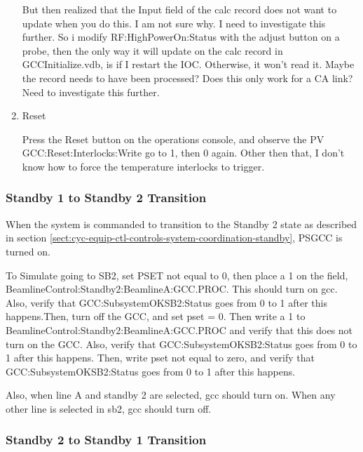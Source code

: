 \documentclass[11pt]{book}		%
\begin{document}
\begin{enumerate}
But then realized that the Input field of the calc record does not want to update when you do this. I am not sure why. I need to investigate this further. So i modify RF:HighPowerOn:Status with the adjust button on a probe, then the only way it will update on the calc record in GCCInitialize.vdb, is if I restart the IOC. Otherwise, it won't read it. Maybe the record needs to have been processed? Does this only work for a CA link? Need to investigate this further.
\color{black}


 \item Reset

\color{red}

Press the Reset button on the operations console, and observe the PV GCC:Reset:Interlocks:Write go to 1, then 0 again. Other then that, I don't know how to force the temperature interlocks to trigger.

\color{black}

\end{enumerate}

\subsubsection{Standby 1 to Standby 2 Transition}

When the system is commanded to transition to the Standby 2 state as described in section \ref{sect:cyc-equip-ctl-controls-system-coordination-standby}, PSGCC is turned on.

\color{red}

To Simulate going to SB2, set PSET not equal to 0, then place a 1 on the field, BeamlineControl:Standby2:BeamlineA:GCC.PROC. This should turn on gcc. Also, verify that GCC:SubsystemOKSB2:Status goes from 0 to 1 after this happens.Then, turn off the GCC, and set pset = 0. Then write a 1 to BeamlineControl:Standby2:BeamlineA:GCC.PROC and verify that this does not turn on the GCC. Also, verify that GCC:SubsystemOKSB2:Status goes from 0 to 1 after this happens. Then, write pset not equal to zero, and verify that GCC:SubsystemOKSB2:Status goes from 0 to 1 after this happens.

Also, when line A and standby 2 are selected, gcc should turn on. When any other line is selected in sb2, gcc should turn off.

\color{black}

\subsubsection{Standby 2 to Standby 1 Transition}
\end{document}
